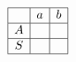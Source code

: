 $\begin{array}{|c|c|c|}
	\hline 
	& a & b \\
	\hline 
	A & & \\
	\hline 
	S & & \\
	\hline
\end{array}$